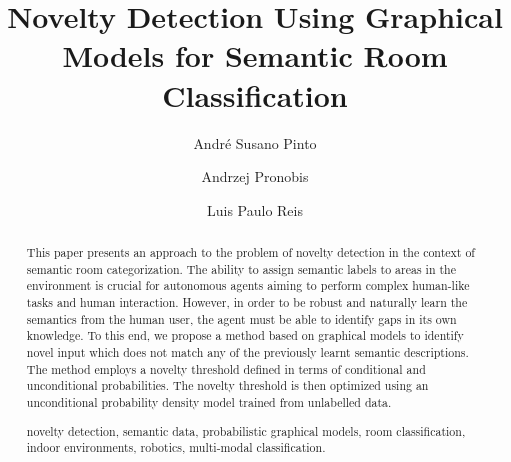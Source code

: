\documentclass[runningheads,a4paper]{llncs}
\newcommand{\keywords}[1]{\par\addvspace\baselineskip
\noindent\keywordname\enspace\ignorespaces#1}
\begin{document}
\mainmatter  %

\title{Novelty Detection Using Graphical Models for Semantic Room Classification}


%
\author{André Susano Pinto \and Andrzej Pronobis \and Luis Paulo Reis}
%


\maketitle


\begin{abstract}
This paper presents an approach to the problem of novelty
detection in the context of semantic room categorization.
The ability to assign semantic labels to areas in the environment is crucial for
autonomous agents aiming to perform complex human-like tasks and human
interaction.
However, in order to be robust and naturally learn the semantics from
the human user, the agent must be able to identify gaps in its own knowledge.
To this end, we propose a method based on graphical models to identify novel
input which does not match any of the previously learnt semantic descriptions.
The method employs a novelty threshold defined in terms of conditional
and unconditional probabilities. The novelty threshold is then optimized using
an unconditional probability density model trained from unlabelled data.


\keywords{novelty detection, semantic data, probabilistic graphical models,
room classification, indoor environments, robotics, multi-modal classification.}
\end{abstract}
\end{document}
